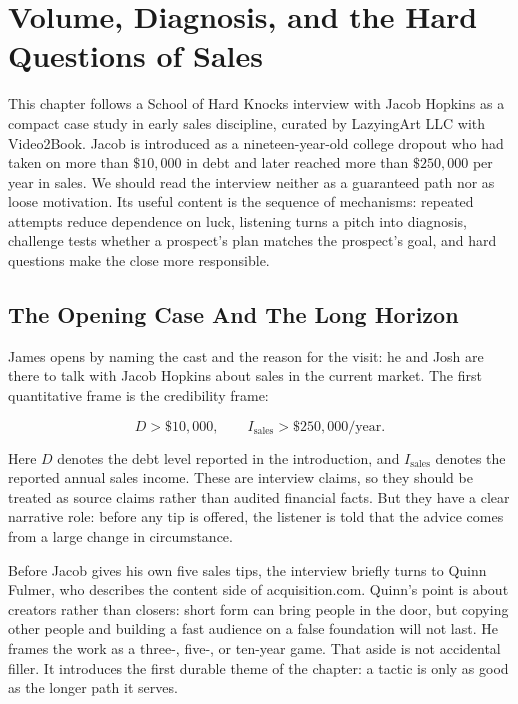 \chapter{Volume, Diagnosis, and the Hard Questions of Sales}

This chapter follows a School of Hard Knocks interview with Jacob Hopkins as a compact case study in early sales discipline, curated by LazyingArt LLC with Video2Book. Jacob is introduced as a nineteen-year-old college dropout who had taken on more than \(\$10{,}000\) in debt and later reached more than \(\$250{,}000\) per year in sales. We should read the interview neither as a guaranteed path nor as loose motivation. Its useful content is the sequence of mechanisms: repeated attempts reduce dependence on luck, listening turns a pitch into diagnosis, challenge tests whether a prospect's plan matches the prospect's goal, and hard questions make the close more responsible.

\section{The Opening Case And The Long Horizon}

James opens by naming the cast and the reason for the visit: he and Josh are there to talk with Jacob Hopkins about sales in the current market. The first quantitative frame is the credibility frame:

\begin{equation}
D > \$10{,}000,
\qquad
I_{\mathrm{sales}} > \$250{,}000/\mathrm{year}.
\end{equation}

Here \(D\) denotes the debt level reported in the introduction, and \(I_{\mathrm{sales}}\) denotes the reported annual sales income. These are interview claims, so they should be treated as source claims rather than audited financial facts. But they have a clear narrative role: before any tip is offered, the listener is told that the advice comes from a large change in circumstance.

Before Jacob gives his own five sales tips, the interview briefly turns to Quinn Fulmer, who describes the content side of acquisition.com. Quinn's point is about creators rather than closers: short form can bring people in the door, but copying other people and building a fast audience on a false foundation will not last. He frames the work as a three-, five-, or ten-year game. That aside is not accidental filler. It introduces the first durable theme of the chapter: a tactic is only as good as the longer path it serves.

